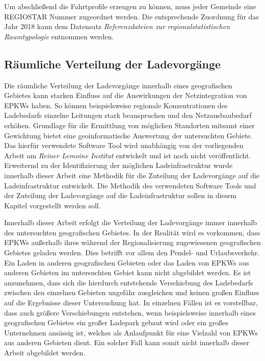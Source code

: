 Um abschließend die Fahrtprofile erzeugen zu können, muss jeder Gemeinde eine \gls{REGIOSTAR} Nummer zugeordnet werden.
Die entsprechende Zuordnung für das Jahr \num{2018} kann dem Datensatz \textit{Referenzdateien zur regionalstatistischen Raumtypologie} \cite[][Stand: ]{BMVIa2020} entnommen werden.


\subsection{Räumliche Verteilung der Ladevorgänge}\label{chap:theo_distribution}

Die räumliche Verteilung der Ladevorgänge innerhalb eines geo­gra­fischen Gebietes kann starken Einfluss auf die Auswirkungen der Netzintegration von \glspl{EPKW} haben.
So können beispielsweise regionale Konzentrationen des Ladebedarfs einzelne Leitungen stark beanspruchen und den Netzausbaubedarf erhöhen.
Grundlage für die Ermittlung von möglichen Standorten mitsamt einer Gewichtung bietet eine geoinformatische Auswertung der untersuchten Gebiete.
Das hierfür verwendete Software Tool wird unabhängig von der vorliegenden Arbeit am \textit{Reiner Lemoine Institut} entwickelt und ist noch nicht veröffentlicht.
Erweiternd zu der Identifizierung der möglichen Ladeinfrastruktur wurde innerhalb dieser Arbeit eine Methodik für die Zuteilung der Ladevorgänge auf die Ladeinfrastruktur entwickelt.
Die Methodik des verwendeten Software Tools und der Zuteilung der Ladevorgänge auf die Ladeinfrastruktur sollen in diesem Kapitel vorgestellt werden soll.\medskip

Innerhalb dieser Arbeit erfolgt die Verteilung der Ladevorgänge immer innerhalb des untersuchten geo­gra­fischen Gebietes.
In der Realität wird es vorkommen, dass \glspl{EPKW} außerhalb ihres während der Regionalisierung zugewiesenen geo­gra­fischen Gebietes geladen werden.
Dies betrifft vor allem den Pendel- und Urlaubsverkehr.
Ein Laden in anderen geo­gra­fischen Gebieten oder das Laden von \glspl{EPKW} aus anderen Gebieten im untersuchten Gebiet kann nicht abgebildet werden.
Es ist anzunehmen, dass sich die hierdurch entstehende Verschiebung des Ladebedarfs zwischen den einzelnen Gebieten ungefähr ausgleichen und keinen großen Einfluss auf die Ergebnisse dieser Untersuchung hat.
In einzelnen Fällen ist es vorstellbar, dass  auch größere Verschiebungen entstehen, wenn beispielsweise innerhalb eines geo­gra­fischen Gebietes ein großer Ladepark gebaut wird oder ein großes Unternehmen ansässig ist, welches als Anlaufpunkt für eine Vielzahl von \glspl{EPKW} aus anderen Gebieten dient. 
Ein solcher Fall kann somit nicht innerhalb dieser Arbeit abgebildet werden.



